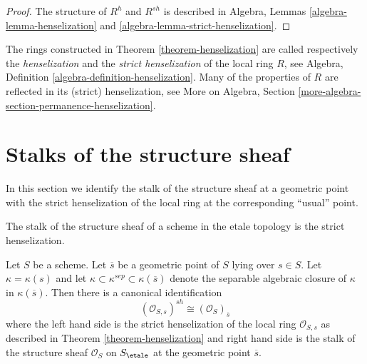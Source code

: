 \begin{proof}
The structure of $R^h$ and $R^{sh}$ is described in
Algebra, Lemmas \ref{algebra-lemma-henselization} and
\ref{algebra-lemma-strict-henselization}.
\end{proof}

\noindent
The rings constructed in Theorem \ref{theorem-henselization}
are called respectively the {\it henselization} and the
{\it strict henselization} of the local ring $R$, see
Algebra, Definition \ref{algebra-definition-henselization}.
Many of the properties of $R$ are reflected in its (strict) henselization,
see More on Algebra,
Section \ref{more-algebra-section-permanence-henselization}.




\section{Stalks of the structure sheaf}
\label{section-stalks-structure-sheaf}

\noindent
In this section we identify the stalk of the structure sheaf at a geometric
point with the strict henselization of the local ring at the corresponding
``usual'' point.

\begin{lemma}
\label{lemma-describe-etale-local-ring}
\begin{slogan}
The stalk of the structure sheaf of a scheme
in the etale topology is the strict henselization.
\end{slogan}
Let $S$ be a scheme.
Let $\overline{s}$ be a geometric point of $S$ lying over $s \in S$.
Let $\kappa = \kappa(s)$ and let
$\kappa \subset \kappa^{sep} \subset \kappa(\overline{s})$ denote
the separable algebraic closure of $\kappa$ in $\kappa(\overline{s})$.
Then there is a canonical identification
$$
(\mathcal{O}_{S, s})^{sh}
\cong
(\mathcal{O}_S)_{\overline{s}}
$$
where the left hand side is the strict henselization of the local ring
$\mathcal{O}_{S, s}$ as described in
Theorem \ref{theorem-henselization}
and right hand side is the stalk of the structure sheaf
$\mathcal{O}_S$ on $S_\etale$ at
the geometric point $\overline{s}$.
\end{lemma}


